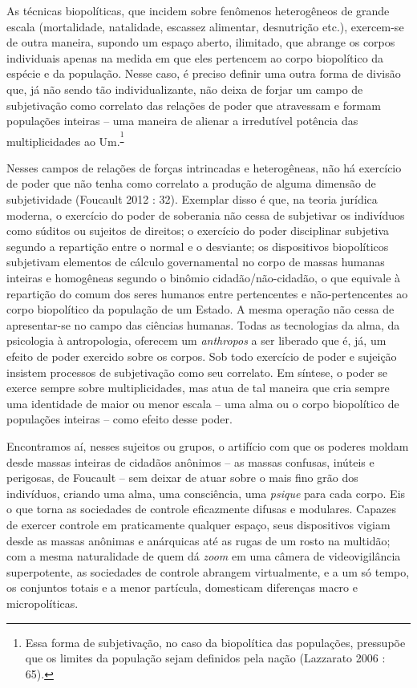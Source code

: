 As técnicas biopolíticas, que incidem sobre fenômenos heterogêneos de
grande escala (mortalidade, natalidade, escassez alimentar, desnutrição
etc.), exercem-se de outra maneira, supondo um espaço aberto, ilimitado,
que abrange os corpos individuais apenas na medida em que eles pertencem
ao corpo biopolítico da espécie e da população. Nesse caso, é preciso
definir uma outra forma de divisão que, já não sendo tão
individualizante, não deixa de forjar um campo de subjetivação como
correlato das relações de poder que atravessam e formam populações
inteiras -- uma maneira de alienar a irredutível potência das
multiplicidades ao Um.\textsuperscript{\footnote{Essa forma de
  subjetivação, no caso da biopolítica das populações, pressupõe que os
  limites da população sejam definidos pela nação (Lazzarato 2006 : 65).}}

Nesses campos de relações de forças intrincadas e heterogêneas, não há
exercício de poder que não tenha como correlato a produção de alguma
dimensão de subjetividade (Foucault 2012 : 32). Exemplar disso é que, na
teoria jurídica moderna, o exercício do poder de soberania não cessa de
subjetivar os indivíduos como súditos ou sujeitos de direitos; o
exercício do poder disciplinar subjetiva segundo a repartição entre o
normal e o desviante; os dispositivos biopolíticos subjetivam elementos
de cálculo governamental no corpo de massas humanas inteiras e
homogêneas segundo o binômio cidadão/não-cidadão, o que equivale à
repartição do comum dos seres humanos entre pertencentes e
não-pertencentes ao corpo biopolítico da população de um Estado. A mesma
operação não cessa de apresentar-se no campo das ciências humanas. Todas
as tecnologias da alma, da psicologia à antropologia, oferecem um
\emph{anthropos} a ser liberado que é, já, um efeito de poder exercido
sobre os corpos. Sob todo exercício de poder e sujeição insistem
processos de subjetivação como seu correlato. Em síntese, o poder se
exerce sempre sobre multiplicidades, mas atua de tal maneira que cria
sempre uma identidade de maior ou menor escala -- uma alma ou o corpo
biopolítico de populações inteiras -- como efeito desse poder.

Encontramos aí, nesses sujeitos ou grupos, o artifício com que os
poderes moldam desde massas inteiras de cidadãos anônimos -- as massas
confusas, inúteis e perigosas, de Foucault -- sem deixar de atuar sobre
o mais fino grão dos indivíduos, criando uma alma, uma consciência, uma
\emph{psique} para cada corpo. Eis o que torna as sociedades de controle
eficazmente difusas e modulares. Capazes de exercer controle em
praticamente qualquer espaço, seus dispositivos vigiam desde as massas
anônimas e anárquicas até as rugas de um rosto na multidão; com a mesma
naturalidade de quem dá \emph{zoom} em uma câmera de videovigilância
superpotente, as sociedades de controle abrangem virtualmente, e a um só
tempo, os conjuntos totais e a menor partícula, domesticam diferenças
macro e micropolíticas.

